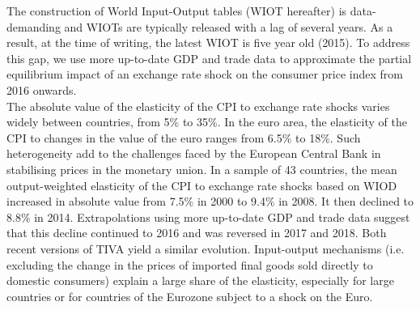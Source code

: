 \documentclass[11pt,a4paper]{article}
\begin{document}
The construction of World Input-Output tables (WIOT hereafter) is data-demanding and WIOTs are typically released with a lag of several years.
As a result, at the time of writing, the latest WIOT is five year old (2015).
To address this gap, we use more up-to-date GDP and trade data to approximate the partial equilibrium impact of an exchange rate shock on the consumer price index from 2016 onwards.\\
The absolute value of the elasticity of the CPI to exchange rate shocks varies widely between countries, from 5\% to 35\%. 
In the euro area, the elasticity of the CPI to changes in the value of the euro ranges from 6.5\% to 18\%. 
Such heterogeneity add to the challenges faced by the European Central Bank in stabilising prices in the monetary union. 
In a sample of 43 countries, the mean output-weighted elasticity of the CPI to exchange rate shocks based on WIOD increased in absolute value from 7.5\% in 2000 to 9.4\% in 2008.
It then declined to 8.8\% in 2014.
Extrapolations using more up-to-date GDP and trade data suggest that this decline continued to 2016 and was reversed in 2017 and 2018.
Both recent versions of TIVA yield a similar evolution.
Input-output mechanisms (i.e. excluding the change in the prices of imported final goods sold directly to domestic consumers) explain a large share of the elasticity, especially for large countries or for countries of the Eurozone subject to a shock on the Euro.\\
\end{document}

